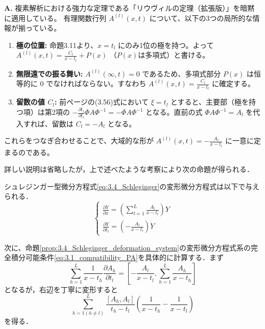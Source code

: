 \begin{Q}
\textbf{A.} 複素解析における強力な定理である「リウヴィルの定理（拡張版）」を暗黙に適用している。
有理関数行列 $A^{(l)}(x,t)$ について、以下の3つの局所的な情報が揃っている。
\begin{enumerate}
    \item \textbf{極の位置:} 命題3.11より、$x=t_l$ にのみ1位の極を持つ。よって $A^{(l)}(x,t) = \frac{C_l}{x-t_l} + P(x)$ （$P(x)$は多項式）と書ける。
    \item \textbf{無限遠での振る舞い:} $A^{(l)}(\infty,t) = 0$ であるため、多項式部分 $P(x)$ は恒等的に $0$ でなければならない。すなわち $A^{(l)}(x,t) = \frac{C_l}{x-t_l}$ に確定する。
    \item \textbf{留数の値 $C_l$:} 前ページの(3.56)式において $\xi = t_l$ とすると、主要部（極を持つ項）は第2項の $- \frac{\partial t_l}{\partial t_l} \Phi A \Phi^{-1} = -\Phi A \Phi^{-1}$ となる。直前の式 $\Phi A \Phi^{-1} = A_l$ を代入すれば、留数は $C_l = -A_l$ となる。
\end{enumerate}
これらをつなぎ合わせることで、大域的な形が $A^{(l)}(x,t) = - \frac{A_l}{x-t_l}$ に一意に定まるのである。
\end{Q}

\begin{story}
詳しい説明は省略したが，上で述べたような考察により次の命題が得られる．

\begin{proposition}\label{prop:3.4_Schleginger_deformation_system}
シュレジンガー型微分方程式\eqref{eq:3.4_Schleginger}の変形微分方程式は以下で与えられる．
\begin{equation*}
  \begin{cases}
    \displaystyle \frac{\partial Y}{\partial x} = \left( \sum_{l=1}^L \frac{A_l}{x-t_l} \right) Y \\[5mm]
    \displaystyle \frac{\partial Y}{\partial t_l} = \left( - \frac{A_l}{x-t_l} \right) Y
  \end{cases}
\end{equation*}
\end{proposition}

次に、命題\ref{prop:3.4_Schleginger_deformation_system}の変形微分方程式系の完全積分可能条件\eqref{eq:3.1_compatibility_PA}を具体的に計算する．まず
\[
  \sum_{h=1}^L \frac{1}{x-t_h} \frac{\partial A_h}{\partial t_l} = \left[ -\frac{A_l}{x-t_l}, \sum_{h=1}^L \frac{A_h}{x-t_h} \right]
\]
となるが，右辺を丁寧に変形すると
\[
  \sum_{h=1(h \neq l)}^L \frac{[A_h, A_l]}{t_h - t_l} \left( \frac{1}{x-t_h} - \frac{1}{x-t_l} \right)
\]
を得る．
\end{story}

